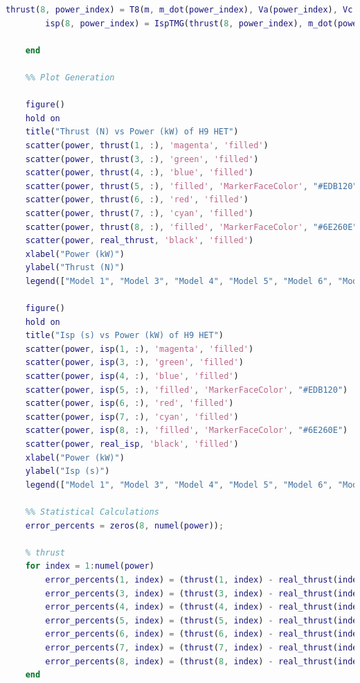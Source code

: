\documentclass[letterpaper, 10 pt, conference]{ieeeconf}  %
\begin{document}
\begin{lstlisting}[language=Matlab]
        thrust(8, power_index) = T8(m, m_dot(power_index), Va(power_index), Vc, q, spec1, spec2, spec3, theta);
        isp(8, power_index) = IspTMG(thrust(8, power_index), m_dot(power_index), g) * cosd(theta);
    
    end
    
    %% Plot Generation
    
    figure()
    hold on
    title("Thrust (N) vs Power (kW) of H9 HET")
    scatter(power, thrust(1, :), 'magenta', 'filled')
    scatter(power, thrust(3, :), 'green', 'filled')
    scatter(power, thrust(4, :), 'blue', 'filled')
    scatter(power, thrust(5, :), 'filled', 'MarkerFaceColor', "#EDB120")
    scatter(power, thrust(6, :), 'red', 'filled')
    scatter(power, thrust(7, :), 'cyan', 'filled')
    scatter(power, thrust(8, :), 'filled', 'MarkerFaceColor', "#6E260E")
    scatter(power, real_thrust, 'black', 'filled')
    xlabel("Power (kW)")
    ylabel("Thrust (N)")
    legend(["Model 1", "Model 3", "Model 4", "Model 5", "Model 6", "Model 7", "Model 8", "Actual Values"])
    
    figure()
    hold on
    title("Isp (s) vs Power (kW) of H9 HET")
    scatter(power, isp(1, :), 'magenta', 'filled')
    scatter(power, isp(3, :), 'green', 'filled')
    scatter(power, isp(4, :), 'blue', 'filled')
    scatter(power, isp(5, :), 'filled', 'MarkerFaceColor', "#EDB120")
    scatter(power, isp(6, :), 'red', 'filled')
    scatter(power, isp(7, :), 'cyan', 'filled')
    scatter(power, isp(8, :), 'filled', 'MarkerFaceColor', "#6E260E")
    scatter(power, real_isp, 'black', 'filled')
    xlabel("Power (kW)")
    ylabel("Isp (s)")
    legend(["Model 1", "Model 3", "Model 4", "Model 5", "Model 6", "Model 7", "Model 8", "Actual Values"])
    
    %% Statistical Calculations
    error_percents = zeros(8, numel(power));
    
    % thrust
    for index = 1:numel(power)
        error_percents(1, index) = (thrust(1, index) - real_thrust(index)) / real_thrust(index) * 100.0;
        error_percents(3, index) = (thrust(3, index) - real_thrust(index)) / real_thrust(index) * 100.0;
        error_percents(4, index) = (thrust(4, index) - real_thrust(index)) / real_thrust(index) * 100.0;
        error_percents(5, index) = (thrust(5, index) - real_thrust(index)) / real_thrust(index) * 100.0;
        error_percents(6, index) = (thrust(6, index) - real_thrust(index)) / real_thrust(index) * 100.0;
        error_percents(7, index) = (thrust(7, index) - real_thrust(index)) / real_thrust(index) * 100.0;
        error_percents(8, index) = (thrust(8, index) - real_thrust(index)) / real_thrust(index) * 100.0;
    end
    

\end{lstlisting}
\end{document}
